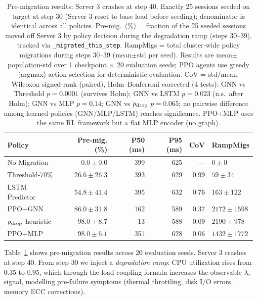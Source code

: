 \documentclass[review,1p]{elsarticle}
\theoremstyle{definition}
\begin{document}
\begin{table}[t]
\centering
\caption{Pre-migration results: Server 3 crashes at step 40.
Exactly 25 sessions seeded on target at step 30 (Server 3 reset to base load before seeding);
denominator is identical across all policies.
Pre-mig.\ (\%) = fraction of the 25 seeded sessions moved off Server 3
by policy decision during the degradation ramp (steps 30--39),
tracked via \texttt{\_migrated\_this\_step}.
RampMigs = total cluster-wide policy migrations during steps 30--39 (mean$\pm$std per seed).
Results are mean$\pm$population-std over 1 checkpoint $\times$ 20 evaluation seeds;
PPO agents use greedy (argmax) action selection for deterministic evaluation.
CoV = std/mean.
Wilcoxon signed-rank (paired), Holm--Bonferroni corrected (4 tests):
GNN vs Threshold $p{=}0.0001$ (survives Holm); GNN vs LSTM $p{=}0.023$ (n.s.\ after Holm);
GNN vs MLP $p{=}0.14$; GNN vs $p_{\rm drop}$ $p{=}0.065$;
no pairwise difference among learned policies (GNN/MLP/LSTM) reaches significance.
PPO+MLP uses the same RL framework but a flat MLP encoder (no graph).}
\label{tab:failure}
\begin{tabular}{lrrrrl}
\toprule
Policy & Pre-mig. (\%) & P50 (ms) & P95 (ms) & CoV & RampMigs \\
\midrule
No Migration     & $0.0\pm0.0$     & 399 & 625 & ---  & $0\pm0$ \\
Threshold-70\%   & $26.6\pm26.3$   & 393 & 629 & 0.99 & $59\pm34$ \\
LSTM Predictor   & $54.8\pm41.4$   & 395 & 632 & 0.76 & $163\pm122$ \\
PPO+GNN          & $86.0\pm31.8$   & 162 & 589 & 0.37 & $2172\pm1598$ \\
$p_{\rm drop}$ heuristic & $98.0\pm8.7$    &  13 & 588 & 0.09 & $2190\pm978$ \\
PPO+MLP          & $98.0\pm6.1$    & 351 & 628 & 0.06 & $1432\pm1772$ \\
\bottomrule
\end{tabular}
\end{table}

Table~\ref{tab:failure} shows pre-migration results across 20 evaluation seeds.
Server 3 crashes at step 40.  From step 30 we inject a
\emph{degradation ramp}: CPU utilization rises from 0.35 to 0.95,
which through the load-coupling formula increases the observable
$\lambda_v$ signal, modelling pre-failure symptoms
(thermal throttling, disk I/O errors, memory ECC corrections).
\end{document}
